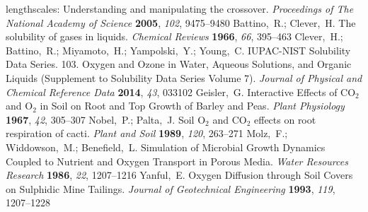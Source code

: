 \documentclass[aps,prl,twocolumn,superscriptaddress,groupedaddress]{revtex4}
\begin{document}
\begin{mcitethebibliography}{88}
  lengthscales: Understanding and manipulating the crossover. \emph{Proceedings
  of The National Academy of Science} \textbf{2005}, \emph{102},
  9475--9480\relax
\mciteBstWouldAddEndPuncttrue
\mciteSetBstMidEndSepPunct{\mcitedefaultmidpunct}
{\mcitedefaultendpunct}{\mcitedefaultseppunct}\relax
\EndOfBibitem
{}
Battino,~R.; Clever,~H. The solubility of gases in liquids. \emph{Chemical
  Reviews} \textbf{1966}, \emph{66}, 395--463\relax
\mciteBstWouldAddEndPuncttrue
\mciteSetBstMidEndSepPunct{\mcitedefaultmidpunct}
{\mcitedefaultendpunct}{\mcitedefaultseppunct}\relax
\EndOfBibitem
{}
Clever,~H.; Battino,~R.; Miyamoto,~H.; Yampolski,~Y.; Young,~C. IUPAC-NIST
  Solubility Data Series. 103. Oxygen and Ozone in Water, Aqueous Solutions,
  and Organic Liquids (Supplement to Solubility Data Series Volume 7).
  \emph{Journal of Physical and Chemical Reference Data} \textbf{2014},
  \emph{43}, 033102\relax
\mciteBstWouldAddEndPuncttrue
\mciteSetBstMidEndSepPunct{\mcitedefaultmidpunct}
{\mcitedefaultendpunct}{\mcitedefaultseppunct}\relax
\EndOfBibitem
{}
Geisler,~G. Interactive Effects of $\mathrm{CO_2}$ and $\mathrm{O_2}$ in Soil
  on Root and Top Growth of Barley and Peas. \emph{Plant Physiology}
  \textbf{1967}, \emph{42}, 305--307\relax
\mciteBstWouldAddEndPuncttrue
\mciteSetBstMidEndSepPunct{\mcitedefaultmidpunct}
{\mcitedefaultendpunct}{\mcitedefaultseppunct}\relax
\EndOfBibitem
{}
Nobel,~P.; Palta,~J. Soil $\mathrm{O_2}$ and $\mathrm{CO_2}$ effects on root
  respiration of cacti. \emph{Plant and Soil} \textbf{1989}, \emph{120},
  263--271\relax
\mciteBstWouldAddEndPuncttrue
\mciteSetBstMidEndSepPunct{\mcitedefaultmidpunct}
{\mcitedefaultendpunct}{\mcitedefaultseppunct}\relax
\EndOfBibitem
{}
Molz,~F.; Widdowson,~M.; Benefield,~L. Simulation of Microbial Growth Dynamics
  Coupled to Nutrient and Oxygen Transport in Porous Media. \emph{Water
  Resources Research} \textbf{1986}, \emph{22}, 1207--1216\relax
\mciteBstWouldAddEndPuncttrue
\mciteSetBstMidEndSepPunct{\mcitedefaultmidpunct}
{\mcitedefaultendpunct}{\mcitedefaultseppunct}\relax
\EndOfBibitem
{}
Yanful,~E. Oxygen Diffusion through Soil Covers on Sulphidic Mine Tailings.
  \emph{Journal of Geotechnical Engineering} \textbf{1993}, \emph{119},
  1207--1228\relax

\end{mcitethebibliography}
\end{document}

